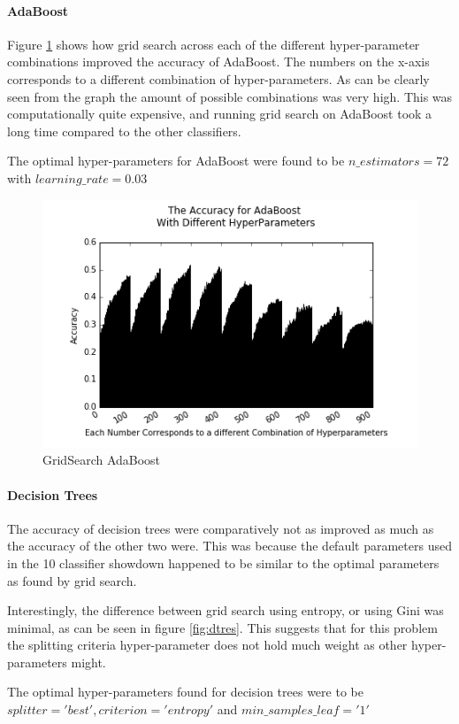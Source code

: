 \documentclass{article}
\begin{document}
\paragraph{AdaBoost}


Figure \ref{fig:abres} shows how grid search across each of the different hyper-parameter combinations improved the accuracy of AdaBoost. The numbers on the x-axis corresponds to a different combination of hyper-parameters. As can be clearly seen from the graph the amount of possible combinations was very high. This was computationally quite expensive, and running grid search on AdaBoost took a long time compared to the other classifiers. 

The optimal hyper-parameters for AdaBoost were found to be $n\_estimators = 72$ with $learning\_rate = 0.03$
\begin{figure}
\includegraphics[scale=0.6]{adaboost_crop}
\caption{GridSearch AdaBoost}
\label{fig:abres}
\end{figure}
\paragraph{Decision Trees}
The accuracy of decision trees were comparatively not as improved as much as the accuracy of the other two were. This was because the default parameters used in the 10 classifier showdown \cite{showdown} happened to be similar to the optimal parameters as found by grid search. 

Interestingly, the difference between grid search using entropy, or using Gini was minimal, as can be seen in figure \ref{fig:dtres}. This suggests that for this problem the splitting criteria hyper-parameter does not hold much weight as other hyper-parameters might. 

The optimal hyper-parameters found for decision trees were to be $splitter = 'best', criterion = 'entropy'$ and $min\_samples\_leaf = '1'$
\end{document}
